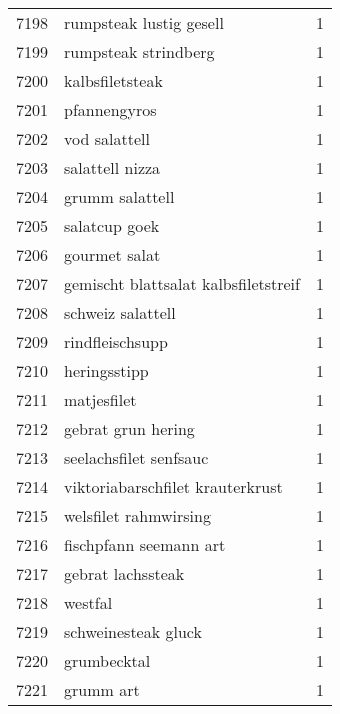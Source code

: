 \begin{tabular}{llr}
7198 &                            rumpsteak lustig gesell &      1 \\
7199 &                               rumpsteak strindberg &      1 \\
7200 &                                    kalbsfiletsteak &      1 \\
7201 &                                       pfannengyros &      1 \\
7202 &                                      vod salattell &      1 \\
7203 &                                    salattell nizza &      1 \\
7204 &                                    grumm salattell &      1 \\
7205 &                                      salatcup goek &      1 \\
7206 &                                      gourmet salat &      1 \\
7207 &               gemischt blattsalat kalbsfiletstreif &      1 \\
7208 &                                  schweiz salattell &      1 \\
7209 &                                    rindfleischsupp &      1 \\
7210 &                                       heringsstipp &      1 \\
7211 &                                        matjesfilet &      1 \\
7212 &                                 gebrat grun hering &      1 \\
7213 &                             seelachsfilet senfsauc &      1 \\
7214 &                   viktoriabarschfilet krauterkrust &      1 \\
7215 &                              welsfilet rahmwirsing &      1 \\
7216 &                             fischpfann seemann art &      1 \\
7217 &                                  gebrat lachssteak &      1 \\
7218 &                                            westfal &      1 \\
7219 &                                schweinesteak gluck &      1 \\
7220 &                                        grumbecktal &      1 \\
7221 &                                          grumm art &      1 \\

\end{tabular}
